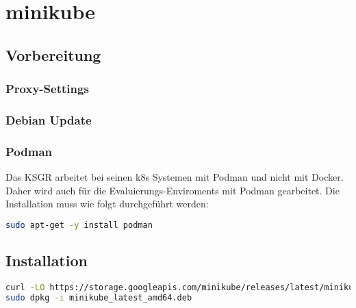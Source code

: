 
\section{minikube}
\subsection{Vorbereitung}
\subsubsection{Proxy-Settings}
\subsubsection{Debian Update}
\subsubsection{Podman}
Das KSGR arbeitet bei seinen k8s Systemen mit Podman und nicht mit Docker.
Daher wird auch für die Evaluierungs-Enviroments mit Podman gearbeitet.
Die Installation muss wie folgt durchgeführt werden:
\lstset{style=gra_codestyle}
\begin{lstlisting}[language=bash, caption=Podman installieren,captionpos=b,label={lst:podman-install},breaklines=true]
sudo apt-get -y install podman
\end{lstlisting}
\subsection{Installation}
\lstset{style=gra_codestyle}
\begin{lstlisting}[language=bash, caption=minikube installieren,captionpos=b,label={lst:minikube-install},breaklines=true]
curl -LO https://storage.googleapis.com/minikube/releases/latest/minikube_latest_amd64.deb
sudo dpkg -i minikube_latest_amd64.deb
\end{lstlisting}
